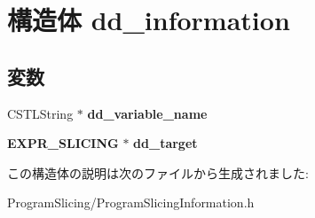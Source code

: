 \section{構造体 dd\_\-information}
\label{structdd__information}
\subsection*{変数}
\begin{DoxyCompactItemize}
\item 
CSTLString $\ast$ {\bfseries dd\_\-variable\_\-name}\label{structdd__information_a6e77bc7e9c96ac0a5cd1fe0eaaa270d6}

\item 
{\bf EXPR\_\-SLICING} $\ast$ {\bfseries dd\_\-target}\label{structdd__information_afec746328ac7bd8699241b82b611c534}

\end{DoxyCompactItemize}


この構造体の説明は次のファイルから生成されました:\begin{DoxyCompactItemize}
\item 
ProgramSlicing/ProgramSlicingInformation.h\end{DoxyCompactItemize}
